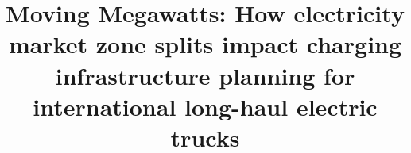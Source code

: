 \documentclass[conference]{IEEEtran}
\begin{document}
\title{Moving Megawatts: How electricity market zone splits impact charging infrastructure planning for international long-haul electric trucks
}


\maketitle
\end{document}

